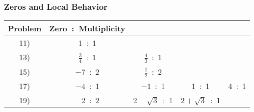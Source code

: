 \documentclass[11pt]{book}
\newcommand{\tmstrong}[1]{\textbf{#1}}
\theoremstyle{definition}  %
\newcommand{\pp}{\par~\par}
\begin{document}

\subsubsection{Zeros and Local Behavior}

\begin{tabular}{c|cccc}
Problem & Zero~:~Multiplicity & & &\\
\hline
11) & 1~:~1 & & &\\ 
13) & $\frac{3}{4}$~:~1 & $\frac{4}{3}$~:~1 & &\\ 
15) & $-7$~:~2 & $\frac{1}{2}$~:~2 & &\\ 
17) & $-4$~:~1 & $-1$~:~1 & 1~:~1 & 4~:~1\\ 
19) & $-2$~:~2 & $2-\sqrt{3}$~:~1 & $2+\sqrt{3}$~:~1 & 
\end{tabular}




\end{document}
